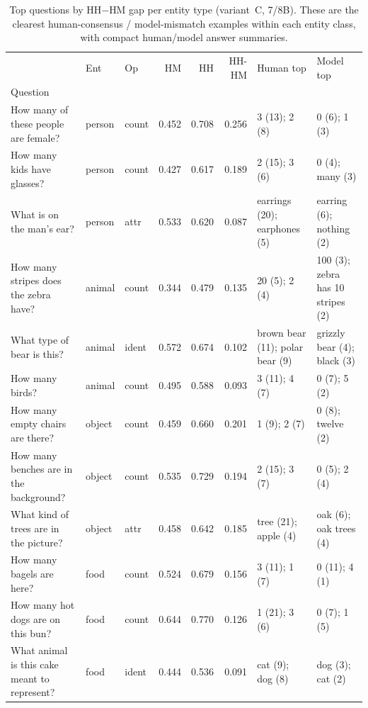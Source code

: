\begin{table}[t]
\centering
\caption{Top questions by HH$-$HM gap per entity type (variant~C, 7/8B). These are the clearest human-consensus / model-mismatch examples within each entity class, with compact human/model answer summaries.}
\label{tab:qual_gap_entity_answers}
\small
\setlength{\tabcolsep}{4pt}
\begin{tabular}{p{4.0cm}llrrrp{2.6cm}p{2.6cm}}
\toprule
 & Ent & Op & HM & HH & HH-HM & Human top & Model top \\
Question &  &  &  &  &  &  &  \\
\midrule
How many of these people are female? & person & count & 0.452 & 0.708 & 0.256 & 3 (13); 2 (8) & 0 (6); 1 (3) \\
How many kids have glasses? & person & count & 0.427 & 0.617 & 0.189 & 2 (15); 3 (6) & 0 (4); many (3) \\
What is on the man's ear? & person & attr & 0.533 & 0.620 & 0.087 & earrings (20); earphones (5) & earring (6); nothing (2) \\
How many stripes does the zebra have? & animal & count & 0.344 & 0.479 & 0.135 & 20 (5); 2 (4) & 100 (3); zebra has 10 stripes (2) \\
What type of bear is this? & animal & ident & 0.572 & 0.674 & 0.102 & brown bear (11); polar bear (9) & grizzly bear (4); black (3) \\
How many birds? & animal & count & 0.495 & 0.588 & 0.093 & 3 (11); 4 (7) & 0 (7); 5 (2) \\
How many empty chairs are there? & object & count & 0.459 & 0.660 & 0.201 & 1 (9); 2 (7) & 0 (8); twelve (2) \\
How many benches are in the background? & object & count & 0.535 & 0.729 & 0.194 & 2 (15); 3 (7) & 0 (5); 2 (4) \\
What kind of trees are in the picture? & object & attr & 0.458 & 0.642 & 0.185 & tree (21); apple (4) & oak (6); oak trees (4) \\
How many bagels are here? & food & count & 0.524 & 0.679 & 0.156 & 3 (11); 1 (7) & 0 (11); 4 (1) \\
How many hot dogs are on this bun? & food & count & 0.644 & 0.770 & 0.126 & 1 (21); 3 (6) & 0 (7); 1 (5) \\
What animal is this cake meant to represent? & food & ident & 0.444 & 0.536 & 0.091 & cat (9); dog (8) & dog (3); cat (2) \\
\bottomrule
\end{tabular}
\end{table}
